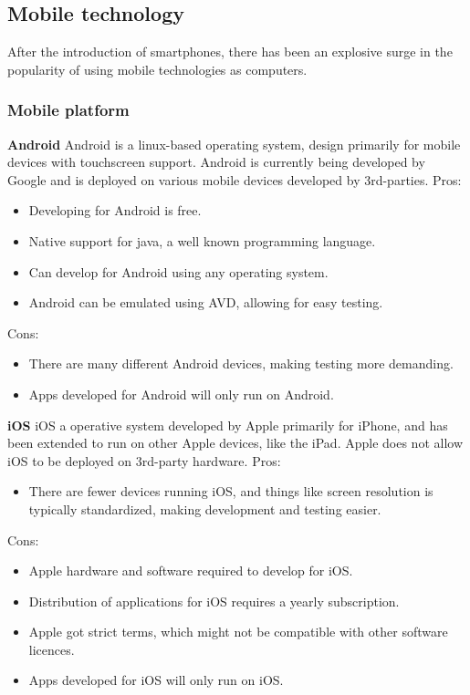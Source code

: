 \subsection{Mobile technology}

After the introduction of smartphones, there has been an explosive surge in the popularity of using mobile technologies as computers.

\subsubsection{Mobile platform}
{\bf Android}
\linebreak
Android is a linux-based operating system, design primarily for mobile devices with touchscreen support. Android is currently being developed by Google and is deployed on various mobile devices developed by 3rd-parties.
\linebreak
Pros:
\begin{itemize}
  \item Developing for Android is free.
  \item Native support for java, a well known programming language.
  \item Can develop for Android using any operating system.
  \item Android can be emulated using AVD, allowing for easy testing.
\end{itemize}
\linebreak
Cons:
\begin{itemize}
  \item There are many different Android devices, making testing more demanding.
  \item Apps developed for Android will only run on Android.
\end{itemize}
\linebreak
{\bf iOS}
iOS a operative system developed by Apple primarily for iPhone, and has been extended to run on other Apple devices, like the iPad. Apple does not allow iOS to be deployed on 3rd-party hardware.
\linebreak
Pros:
\begin{itemize}
  \item There are fewer devices running iOS, and things like screen resolution is typically standardized, making development and testing easier.
\end{itemize}
Cons:
\begin{itemize}
  \item Apple hardware and software required to develop for iOS.
  \item Distribution of applications for iOS requires a yearly subscription.
  \item Apple got strict terms, which might not be compatible with other software licences.
  \item Apps developed for iOS will only run on iOS.
\end{itemize}
\linebreak
